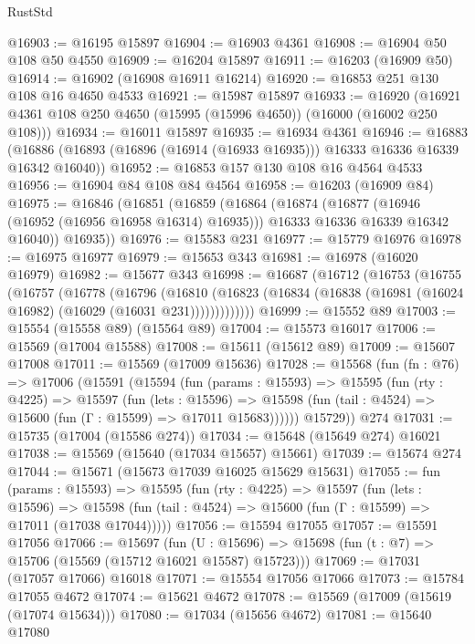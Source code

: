 \begin{lexlean}{RustStd}
\begin{coremodule}
{\begin{coremodule}
{{{{{{{{{{{{{{{{{{{{{{{{{{{{{{{{{{{{{{{{{{{{{{{{{{{{{{{{{{{{@16903 := @16195 @15897
@16904 := @16903 @4361
@16908 := @16904 @50 @108 @50 @4550
@16909 := @16204 @15897
@16911 := @16203 (@16909 @50)
@16914 := @16902 (@16908 @16911 @16214)
@16920 := @16853 @251 @130 @108 @16 @4650 @4533
@16921 := @15987 @15897
@16933 := @16920 (@16921 @4361 @108 @250 @4650 (@15995 (@15996 @4650)) (@16000 (@16002 @250 @108)))
@16934 := @16011 @15897
@16935 := @16934 @4361
@16946 := @16883
    (@16886 (@16893 (@16896 (@16914 (@16933 @16935))) @16333 @16336 @16339 @16342 @16040))
@16952 := @16853 @157 @130 @108 @16 @4564 @4533
@16956 := @16904 @84 @108 @84 @4564
@16958 := @16203 (@16909 @84)
@16975 := @16846
    (@16851
      (@16859
        (@16864
          (@16874
            (@16877 (@16946 (@16952 (@16956 @16958 @16314) @16935)))
            @16333
            @16336
            @16339
            @16342
            @16040))
        @16935))
@16976 := @15583 @231
@16977 := @15779 @16976
@16978 := @16975 @16977
@16979 := @15653 @343
@16981 := @16978 (@16020 @16979)
@16982 := @15677 @343
@16998 := @16687
    (@16712
      (@16753
        (@16755
          (@16757
            (@16778
              (@16796
                (@16810
                  (@16823 (@16834 (@16838 (@16981 (@16024 @16982) (@16029 (@16031 @231)))))))))))))
@16999 := @15552 @89
@17003 := @15554 (@15558 @89) (@15564 @89)
@17004 := @15573 @16017
@17006 := @15569 (@17004 @15588)
@17008 := @15611 (@15612 @89)
@17009 := @15607 @17008
@17011 := @15569 (@17009 @15636)
@17028 := @15568
    (fun (fn : @76) =>
    @17006
      (@15591
        (@15594
          (fun (params : @15593) =>
          @15595
            (fun (rty : @4225) =>
            @15597
              (fun (lets : @15596) =>
              @15598 (fun (tail : @4524) => @15600 (fun (Γ : @15599) => @17011 @15683))))))
        @15729))
    @274
@17031 := @15735 (@17004 (@15586 @274))
@17034 := @15648 (@15649 @274) @16021
@17038 := @15569 (@15640 (@17034 @15657) @15661)
@17039 := @15674 @274
@17044 := @15671 (@15673 @17039 @16025 @15629 @15631)
@17055 := fun (params : @15593) =>
  @15595
    (fun (rty : @4225) =>
    @15597
      (fun (lets : @15596) =>
      @15598 (fun (tail : @4524) => @15600 (fun (Γ : @15599) => @17011 (@17038 @17044)))))
@17056 := @15594 @17055
@17057 := @15591 @17056
@17066 := @15697
    (fun (U : @15696) => @15698 (fun (t : @7) => @15706 (@15569 (@15712 @16021 @15587) @15723)))
@17069 := @17031 (@17057 @17066) @16018
@17071 := @15554 @17056 @17066
@17073 := @15784 @17055 @4672
@17074 := @15621 @4672
@17078 := @15569 (@17009 (@15619 (@17074 @15634)))
@17080 := @17034 (@15656 @4672)
@17081 := @15640 @17080
}}}}}}}}}}}}}}}}}}}}}}}}}}}}}}}}}}}}}}}}}}}}}}}}}}}}}}}}}}}}
\end{coremodule}}
\end{coremodule}
\end{lexlean}
